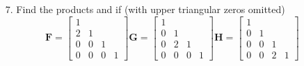 \begin{itemize}
\begin{itemize}
      \item[7.] Find the products  and  if (with upper
        triangular zeros omitted)
        \[%
        \bm{F} = \begin{bmatrix}
          1 &  &  \\
          2 & 1 &  \\
          0 & 0 & 1 \\
          0 & 0 & 0 & 1
        \end{bmatrix}
        \bm{G} = \begin{bmatrix}
          1 &  &  \\
          0 & 1 &  \\
          0 & 2 & 1 \\
          0 & 0 & 0 & 1
        \end{bmatrix}
        \bm{H} = \begin{bmatrix}
          1 &  &  \\
          0 & 1 &  \\
          0 & 0 & 1 \\
          0 & 0 & 2 & 1
        \end{bmatrix}
        \]%
       \fg{\[
         \bm{FGH} =
         \begin{bmatrix}
           1 & 0 & 0 & 0 \\
           2 & 1 & 0 & 0 \\
           0 & 2 & 1 & 0 \\
           0 & 0 & 2 & 1
         \end{bmatrix} \quad
         \bm{HGF} =
         \begin{bmatrix}
           1 & 0 & 0 & 0 \\
           2 & 1 & 0 & 0 \\
           4 & 2 & 1 & 0 \\
           8 & 4 & 2 & 1
         \end{bmatrix} \quad
       \]}

      \end{itemize}

     \newpage


\end{itemize}
